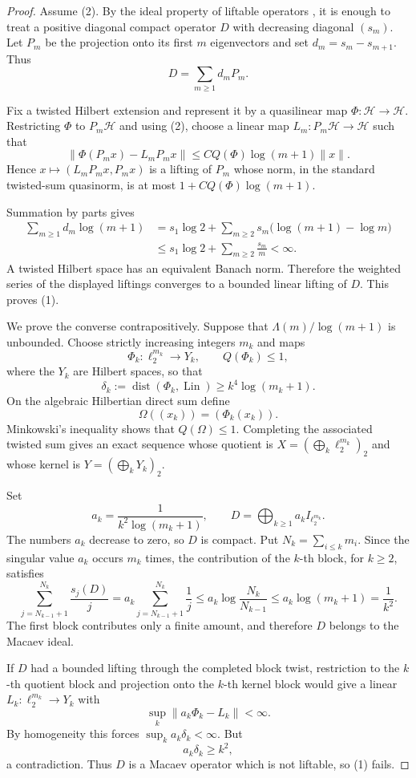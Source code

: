 \documentclass[11pt]{article}
\newcommand{\Hh}{\mathcal H}
\newcommand{\Qlin}{Q}
\newcommand{\Lin}{\operatorname{Lin}}
\newcommand{\dist}{\operatorname{dist}}
\begin{document}
\begin{proof}
Assume (2). By the ideal property of liftable operators \cite[Lemma 1]{CG},
it is enough to treat a positive diagonal compact operator $D$ with decreasing
diagonal $(s_m)$. Let $P_m$ be the projection onto its first $m$ eigenvectors
and set $d_m=s_m-s_{m+1}$. Thus
\[
 D=\sum_{m\geq1}d_mP_m.
\]

Fix a twisted Hilbert extension and represent it by a quasilinear map
$\Phi:\Hh\to\Hh$. Restricting $\Phi$ to $P_m\Hh$ and using (2), choose a
linear map $L_m:P_m\Hh\to\Hh$ such that
\[
 \|\Phi(P_mx)-L_mP_mx\|
 \leq C\Qlin(\Phi)\log(m+1)\|x\|.
\]
Hence $x\mapsto(L_mP_mx,P_mx)$ is a lifting of $P_m$ whose norm, in the
standard twisted-sum quasinorm, is at most
$1+C\Qlin(\Phi)\log(m+1)$.

Summation by parts gives
\begin{align*}
 \sum_{m\geq1}d_m\log(m+1)
 &=s_1\log2+
   \sum_{m\geq2}s_m\bigl(\log(m+1)-\log m\bigr)\\
 &\leq s_1\log2+\sum_{m\geq2}\frac{s_m}{m}<\infty.
\end{align*}
A twisted Hilbert space has an equivalent Banach norm. Therefore the weighted
series of the displayed liftings converges to a bounded linear lifting of
$D$. This proves (1).

We prove the converse contrapositively. Suppose that
$\Lambda(m)/\log(m+1)$ is unbounded. Choose strictly increasing integers
$m_k$ and maps
\[
 \Phi_k:\ell_2^{m_k}\to Y_k,\qquad \Qlin(\Phi_k)\leq1,
\]
where the $Y_k$ are Hilbert spaces, so that
\[
 \delta_k:=\dist(\Phi_k,\Lin)
 \geq k^4\log(m_k+1).
\]
On the algebraic Hilbertian direct sum define
\[
 \Omega((x_k))=(\Phi_k(x_k)).
\]
Minkowski's inequality shows that $\Qlin(\Omega)\leq1$. Completing the
associated twisted sum gives an exact sequence whose quotient is
$X=(\bigoplus_k\ell_2^{m_k})_2$ and whose kernel is
$Y=(\bigoplus_kY_k)_2$.

Set
\[
 a_k=\frac1{k^2\log(m_k+1)},\qquad
 D=\bigoplus_{k\geq1}a_k I_{\ell_2^{m_k}}.
\]
The numbers $a_k$ decrease to zero, so $D$ is compact. Put
$N_k=\sum_{i\leq k}m_i$. Since the singular value $a_k$ occurs $m_k$
times, the contribution of the $k$-th block, for $k\geq2$, satisfies
\[
 \sum_{j=N_{k-1}+1}^{N_k}\frac{s_j(D)}j
 =a_k\sum_{j=N_{k-1}+1}^{N_k}\frac1j
 \leq a_k\log\frac{N_k}{N_{k-1}}
 \leq a_k\log(m_k+1)=\frac1{k^2}.
\]
The first block contributes only a finite amount, and therefore $D$ belongs
to the Macaev ideal.

If $D$ had a bounded lifting through the completed block twist, restriction
to the $k$-th quotient block and projection onto the $k$-th kernel block
would give a linear $L_k:\ell_2^{m_k}\to Y_k$ with
\[
  \sup_k\|a_k\Phi_k-L_k\|<\infty.
\]
By homogeneity this forces $\sup_k a_k\delta_k<\infty$. But
\[
  a_k\delta_k\geq k^2,
\]
a contradiction. Thus $D$ is a Macaev operator which is not liftable, so
(1) fails.
\end{proof}
\end{document}
